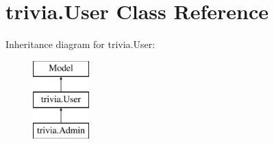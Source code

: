\hypertarget{classtrivia_1_1User}{}\section{trivia.\+User Class Reference}
\label{classtrivia_1_1User}
Inheritance diagram for trivia.\+User\+:\begin{figure}[H]
\begin{center}
\leavevmode
\includegraphics[height=3.000000cm]{classtrivia_1_1User}
\end{center}
\end{figure}
